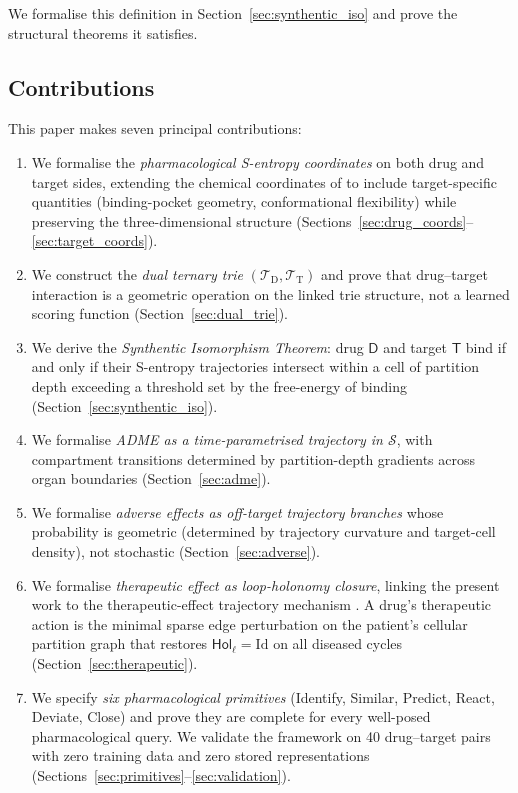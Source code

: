 \documentclass[11pt,twocolumn,a4paper]{article}
\theoremstyle{definition}
\theoremstyle{remark}
\newcommand{\Sspace}{\mathcal{S}}
\newcommand{\Trie}{\mathcal{T}}
\newcommand{\Dtrie}{\Trie_{\mathrm{D}}}
\newcommand{\Ttrie}{\Trie_{\mathrm{T}}}
\newcommand{\Drug}{\mathsf{D}}
\newcommand{\Target}{\mathsf{T}}
\newcommand{\Hol}{\mathsf{Hol}}
\begin{document}
We formalise this definition in Section~\ref{sec:synthentic_iso} and prove the structural theorems it satisfies.

\subsection{Contributions}

This paper makes seven principal contributions:

\begin{enumerate}[nosep,leftmargin=*]
\item We formalise the \emph{pharmacological S-entropy coordinates} on both drug and target sides, extending the chemical coordinates of \citep{sachikonye2025c} to include target-specific quantities (binding-pocket geometry, conformational flexibility) while preserving the three-dimensional structure (Sections~\ref{sec:drug_coords}--\ref{sec:target_coords}).

\item We construct the \emph{dual ternary trie} $(\Dtrie, \Ttrie)$ and prove that drug--target interaction is a geometric operation on the linked trie structure, not a learned scoring function (Section~\ref{sec:dual_trie}).

\item We derive the \emph{Synthentic Isomorphism Theorem}: drug $\Drug$ and target $\Target$ bind if and only if their S-entropy trajectories intersect within a cell of partition depth exceeding a threshold set by the free-energy of binding (Section~\ref{sec:synthentic_iso}).

\item We formalise \emph{ADME as a time-parametrised trajectory in $\Sspace$}, with compartment transitions determined by partition-depth gradients across organ boundaries (Section~\ref{sec:adme}).

\item We formalise \emph{adverse effects as off-target trajectory branches} whose probability is geometric (determined by trajectory curvature and target-cell density), not stochastic (Section~\ref{sec:adverse}).

\item We formalise \emph{therapeutic effect as loop-holonomy closure}, linking the present work to the therapeutic-effect trajectory mechanism \citep{sachikonye2025f}. A drug's therapeutic action is the minimal sparse edge perturbation on the patient's cellular partition graph that restores $\Hol_\ell = \mathrm{Id}$ on all diseased cycles (Section~\ref{sec:therapeutic}).

\item We specify \emph{six pharmacological primitives} (Identify, Similar, Predict, React, Deviate, Close) and prove they are complete for every well-posed pharmacological query. We validate the framework on 40 drug--target pairs with zero training data and zero stored representations (Sections~\ref{sec:primitives}--\ref{sec:validation}).
\end{enumerate}
\end{document}
